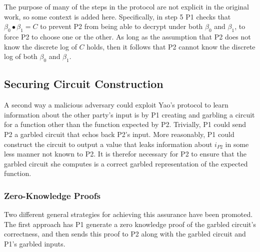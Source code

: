 The purpose of many of the steps in the protocol are not explicit in the original work\cite{bellare1990non}, so some context is added here.  Specifically, in step 5 \ac{P1} checks that $\beta_0 \bullet \beta_1 = C$ to prevent \ac{P2} from being able to decrypt under both $\beta_0$ and $\beta_1$, to force \ac{P2} to choose one or the other. As long as the assumption that \ac{P2} does not know the discrete log of $C$ holds, then it follows that \ac{P2} cannot know the discrete log of both $\beta_0$ and $\beta_1$.



\subsection{Securing Circuit Construction}
\label{sec:securingcircuits}

A second way a malicious adversary could exploit Yao's protocol to learn information about the other party's input is by \ac{P1} creating and garbling a circuit for a function other than the function expected by \ac{P2}. Trivially, \ac{P1} could send \ac{P2} a garbled circuit that echos back \ac{P2}'s input.  More reasonably, \ac{P1} could construct the circuit to output a value that leaks information about $i_{P2}$ in some less manner not known to \ac{P2}.  It is therefor necessary for \ac{P2} to ensure that the garbled circuit she computes is a correct garbled representation of the expected function.

\subsubsection{Zero-Knowledge Proofs}

Two different general strategies for achieving this assurance have been promoted.  The first approach has \ac{P1} generate a zero knowledge proof of the garbled circuit's correctness, and then sends this proof to \ac{P2} along with the garbled circuit and \ac{P1}'s garbled inputs\cite{goldreich1987play, goldreich2009foundations}.

